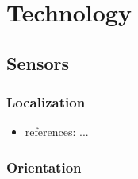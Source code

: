 \documentclass[review]{elsarticle}
\begin{document}

\section{Technology}
\label{sec:technology}

\subsection{Sensors}
\label{sec:technology:sensors}

\subsubsection{Localization}
\label{sec:technology:sensors:localization}

\begin{itemize}
\item references: ...
\end{itemize}

\subsubsection{Orientation}
\label{sec:technology:sensors:orientation}
\end{document}

